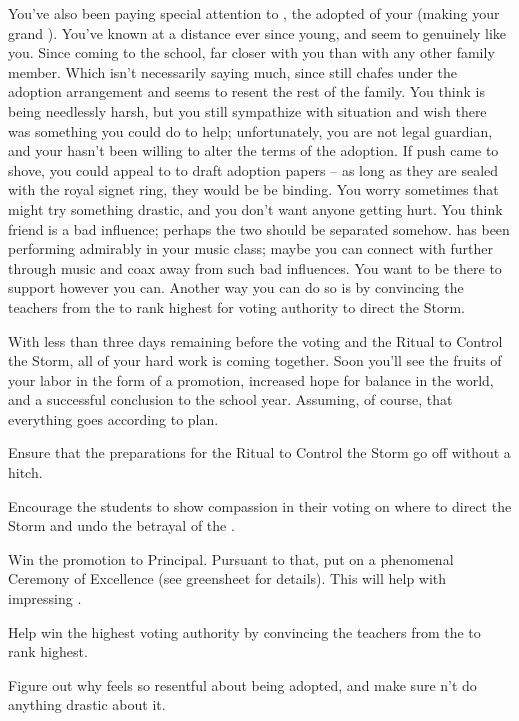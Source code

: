 \documentclass[char]{GL2020}
\begin{document}
You've also been paying special attention to \cAdopted{\full}, the adopted \cAdopted{\child} of your \cAdoptedParentOne{\nibling} (making \cAdopted{} your grand \cAdopted{\nibling}). You've known \cAdopted{} at a distance ever since \cAdopted{\they} \cAdopted{\were} young, and \cAdopted{\they} seem\cAdopted{\plural} to genuinely like you. Since coming to the school, \cAdopted{\theyare} far closer with you than with any other family member. Which isn't necessarily saying much, since \cAdopted{} still chafes under the adoption arrangement and seems to resent the rest of the family. You think \cAdopted{} is being needlessly harsh, but you still sympathize with \cAdopted{\their} situation and wish there was something you could do to help; unfortunately, you are not \cAdopted{\their} legal guardian, and your \cAdoptedParentOne{\nibling} hasn't been willing to alter the terms of the adoption. If push came to shove, you could appeal to \cPrince{\full} to draft adoption papers – as long as they are sealed with the royal signet ring, they would be be binding. You worry sometimes that \cAdopted{} might try something drastic, and you don't want anyone getting hurt. You think \cAdopted{\their} friend \cLibAssist{\full} is a bad influence; perhaps the two should be separated somehow. \cAdopted{} has been performing admirably in your music class; maybe you can connect with \cAdopted{\them} further through music and coax \cAdopted{\them} away from such bad influences. You want to be there to support \cAdopted{} however you can. Another way you can do so is by convincing the teachers from the \pTech{} to rank \cAdopted{\them} highest for voting authority to direct the Storm.

With less than three days remaining before the voting and the Ritual to Control the Storm, all of your hard work is coming together. Soon you'll see the fruits of your labor in the form of a promotion, increased hope for balance in the world, and a successful conclusion to the school year. Assuming, of course, that everything goes according to plan.

\begin{itemz}
	\item Ensure that the preparations for the Ritual to Control the Storm go off without a hitch.
	\item Encourage the students to show compassion in their voting on where to direct the Storm and undo the betrayal of the \pShip{}.
	\item Win the promotion to Principal. Pursuant to that, put on a phenomenal Ceremony of Excellence (see greensheet for details). This will help with impressing \cPrincipal{}.
	\item Help \cAdopted{} win the highest voting authority by convincing the teachers from the \pTech{} to rank \cAdopted{\them} highest.
	\item Figure out why \cAdopted{} feels so resentful about being adopted, and make sure \cAdopted{\they} \cAdopted{\does}n't do anything drastic about it.
\end{itemz}
\end{document}
